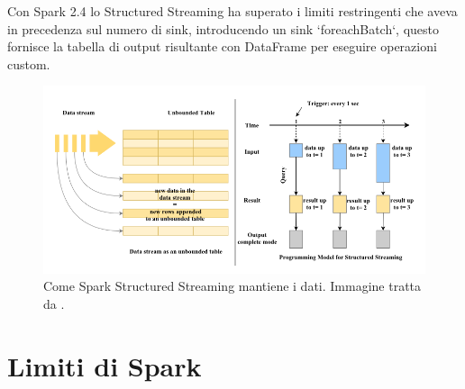 \documentclass[12pt,italian]{article}
\begin{document}
Con Spark 2.4 lo Structured Streaming ha superato i limiti restringenti che aveva in precedenza sul numero di sink, introducendo un sink `foreachBatch`, questo fornisce la tabella di output risultante
con DataFrame per eseguire operazioni custom.
\begin{figure}
	\centering 
	\includegraphics[width=0.8\linewidth]{img/sparkStructuredStreaming.png}
	\caption{Come Spark Structured Streaming mantiene i dati. Immagine tratta da \cite{structuredStreaming}.}
	\label{fig:StructuredStreaming}
\end{figure}
\section{Limiti di Spark}
\newpage
\printbibliography
\end{document}
